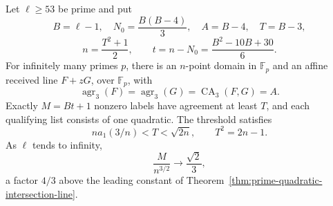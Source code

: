 \begin{proposition}
\label{prop:elliptic-triple-core}
Let $\ell\ge53$ be prime and put
\[
 B=\ell-1,\quad N_0=\frac{B(B-4)}3,\quad A=B-4,\quad T=B-3,
\]
\[
 n=\frac{T^2+1}{2},\qquad
 t=n-N_0=\frac{B^2-10B+30}{6}.
\]
For infinitely many primes $p$, there is an $n$-point domain in
$\mathbb F_p$ and an affine received line $F+zG$, over $\mathbb F_p$,
with
\[
 \operatorname{agr}_3(F)=\operatorname{agr}_3(G)
 =\operatorname{CA}_3(F,G)=A.
\]
Exactly $M=Bt+1$ nonzero labels have agreement at least $T$, and each
qualifying list consists of one quadratic. The threshold satisfies
\[
 na_1(3/n)<T<\sqrt{2n},\qquad T^2=2n-1.
\]
As $\ell$ tends to infinity,
\[
 \frac{M}{n^{3/2}}\longrightarrow\frac{\sqrt2}{3},
\]
a factor $4/3$ above the leading constant of
Theorem~\ref{thm:prime-quadratic-intersection-line}.
\end{proposition}
